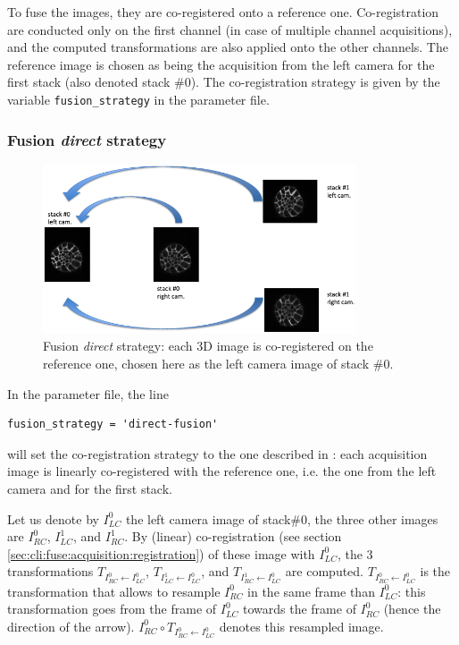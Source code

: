 To fuse the images, they are co-registered onto a reference one. Co-registration are conducted only on the first channel (in case of multiple channel acquisitions), and the computed transformations are also applied onto the other channels. The reference image is chosen as being the acquisition from the left camera for the first stack (also denoted stack \#0). The co-registration strategy is given by the variable \texttt{fusion\_strategy} in the parameter file.


\subsubsection{Fusion \textit{direct} strategy}

\begin{figure}
\begin{center}
\includegraphics[height=50mm]{figures/fusion-direct-strategy.png}
\end{center}
\caption{\label{fig:cli:fuse:direct:strategy} Fusion \textit{direct} strategy: each 3D image is co-registered on the reference one, chosen here as the left camera image of stack \#0.}
\end{figure}

In the parameter file, the line
\begin{verbatim}
fusion_strategy = 'direct-fusion'
\end{verbatim}
will set the co-registration strategy to the one described in \cite{guignard:tel-01278725,guignard:hal-01938126}: each acquisition image is linearly co-registered with the reference one, i.e. the one from the left camera and for the first stack.

Let us denote by $I^{0}_{LC}$ the left camera image of stack\#0, the three other images are $I^{0}_{RC}$, $I^{1}_{LC}$, and $I^{1}_{RC}$. By (linear) co-registration (see section \ref{sec:cli:fuse:acquisition:registration}) of these image with $I^{0}_{LC}$, the 3 transformations
$T_{I^{0}_{RC} \leftarrow I^{0}_{LC}}$,
$T_{I^{1}_{LC} \leftarrow I^{0}_{LC}}$, and
$T_{I^{1}_{RC} \leftarrow I^{0}_{LC}}$
are computed.
$T_{I^{0}_{RC} \leftarrow I^{0}_{LC}}$ is the transformation that allows to resample $I^{0}_{RC}$ in the same frame than $I^{0}_{LC}$: this transformation goes from the frame of $I^{0}_{LC}$ towards the frame of $I^{0}_{RC}$ (hence the direction of the arrow).
$I^{0}_{RC} \circ T_{I^{0}_{RC} \leftarrow I^{0}_{LC}}$ denotes this resampled image.



